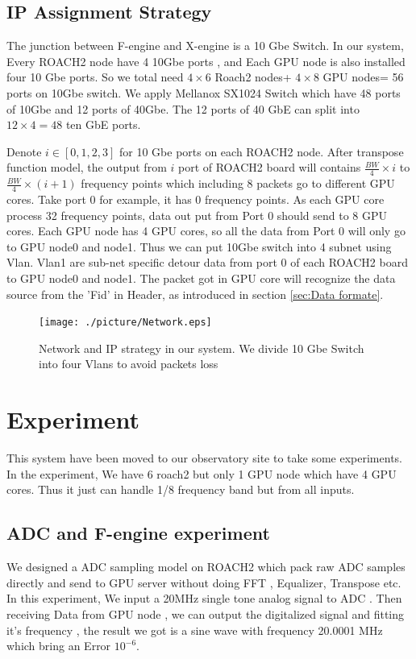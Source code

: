 \documentclass{ws-jai}
\begin{document}
\subsection{IP Assignment Strategy\label{sec:IP assignment}}
The junction between F-engine and X-engine is a 10 Gbe Switch. In our system, Every ROACH2 node have 4 10Gbe ports , and Each GPU node is also installed four 10 Gbe ports. So we total need $4\times 6 $ Roach2 nodes+ $4 \times 8 $ GPU nodes= 56 ports on  10Gbe switch. We apply Mellanox SX1024 Switch which have 48 ports of 10Gbe and 12 ports of 40Gbe. The 12 ports of 40 GbE can split into $12\times4=48$ ten GbE ports.

	Denote  $i \in[0,1,2,3]$ for 10 Gbe ports on each ROACH2 node. After transpose function model, the output from $i$ port of ROACH2 board will contains $\frac{BW}{4} \times i $ to $\frac{BW}{4} \times (i+1)$ frequency points which including 8 packets go to different GPU cores. Take port 0 for example, it has 0 frequency points. As each GPU core process 32 frequency points, data out put from Port 0 should send to 8 GPU cores. Each GPU node has 4 GPU cores, so all the data from Port 0 will only go to GPU node0 and node1.  Thus we can put 10Gbe switch into 4 subnet using Vlan. Vlan1 are sub-net specific detour data from port 0 of each ROACH2 board to GPU node0 and node1. The packet got in GPU core will recognize the data source from the 'Fid' in Header, as introduced in section \ref{sec:Data formate}.
\begin{figure}[t]
 \centering
 \texttt{[image: ./picture/Network.eps]}
 \caption{Network and IP strategy in our system. We divide 10 Gbe Switch into four Vlans to avoid packets loss}
\end{figure}

\section{Experiment}\label{sec:experiment}
This system have been moved to our observatory site to take some experiments.  In the experiment, We have 6 roach2 but only 1 GPU node which have 4 GPU cores. Thus it just can handle 1/8 frequency band but from all inputs. 
\subsection{ADC and F-engine experiment}
We designed a ADC sampling model on ROACH2 which pack raw ADC samples directly and send to GPU server without doing FFT , Equalizer, Transpose etc. In this experiment, We input a 20MHz single tone analog signal to ADC . Then receiving Data from GPU node , we can output the digitalized signal and fitting it's frequency , the result we got is a sine wave with frequency 20.0001 MHz which bring an Error $10^{-6}$. 
\end{document}
